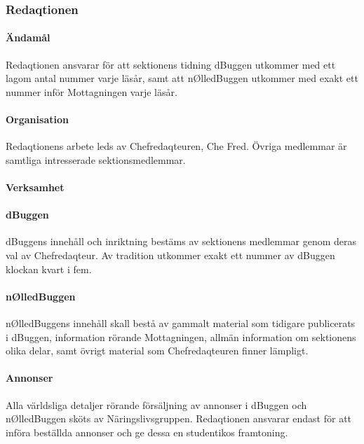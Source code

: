 \documentclass[a4paper,12pt]{article}
\begin{document}
\subsubsection{Redaqtionen}

\paragraph{Ändamål}

Redaqtionen ansvarar för att sektionens tidning dBuggen utkommer med ett lagom antal nummer varje läsår, samt att nØlledBuggen utkommer med exakt ett nummer inför Mottagningen varje läsår.

\paragraph{Organisation}

Redaqtionens arbete leds av Chefredaqteuren, Che Fred. Övriga medlemmar är samtliga intresserade sektionsmedlemmar.

\paragraph{Verksamhet}

\paragraph{dBuggen}

dBuggens innehåll och inriktning bestäms av sektionens medlemmar genom deras val av Chefredaqteur. Av tradition utkommer exakt ett nummer av dBuggen klockan kvart i fem.

\paragraph{nØlledBuggen}

nØlledBuggens innehåll skall bestå av gammalt material som tidigare publicerats i dBuggen, information rörande Mottagningen, allmän information om sektionens olika delar, samt övrigt material som Chefredaqteuren finner lämpligt.

\paragraph{Annonser}

Alla världsliga detaljer rörande försäljning av annonser i dBuggen och nØlledBuggen sköts av Näringslivsgruppen. Redaqtionen ansvarar endast för att införa beställda annonser och ge dessa en studentikos framtoning.
\end{document}
